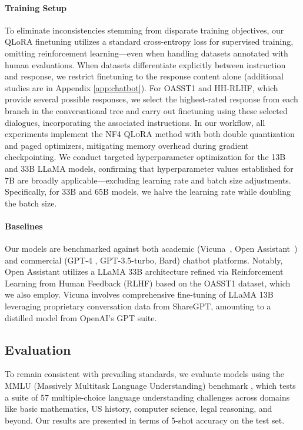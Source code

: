 \paragraph{Training Setup} To eliminate inconsistencies stemming from disparate training objectives, our QLoRA finetuning utilizes a standard cross-entropy loss for supervised training, omitting reinforcement learning—even when handling datasets annotated with human evaluations. When datasets differentiate explicitly between instruction and response, we restrict finetuning to the response content alone (additional studies are in Appendix \ref{app:chatbot}). For OASST1 and HH-RLHF, which provide several possible responses, we select the highest-rated response from each branch in the conversational tree and carry out finetuning using these selected dialogues, incorporating the associated instructions. In our workflow, all experiments implement the NF4 \textsc{QLoRA} method with both double quantization and paged optimizers, mitigating memory overhead during gradient checkpointing. We conduct targeted hyperparameter optimization for the 13B and 33B LLaMA models, confirming that hyperparameter values established for 7B are broadly applicable—excluding learning rate and batch size adjustments. Specifically, for 33B and 65B models, we halve the learning rate while doubling the batch size.

\paragraph{Baselines} Our models are benchmarked against both academic (Vicuna~\citep{vicuna2023}, Open Assistant~\citep{kopf2023openassistant}) and commercial (GPT-4 \citep{openai2023gpt}, GPT-3.5-turbo, Bard) chatbot platforms. Notably, Open Assistant utilizes a LLaMA 33B architecture refined via Reinforcement Learning from Human Feedback (RLHF) based on the OASST1 dataset, which we also employ. Vicuna involves comprehensive fine-tuning of LLaMA 13B leveraging proprietary conversation data from ShareGPT, amounting to a distilled model from OpenAI's GPT suite.

\subsection{Evaluation}

To remain consistent with prevailing standards, we evaluate models using the MMLU (Massively Multitask Language Understanding) benchmark \citep{hendrycksmeasuring}, which tests a suite of 57 multiple-choice language understanding challenges across domains like basic mathematics, US history, computer science, legal reasoning, and beyond. Our results are presented in terms of 5-shot accuracy on the test set.

